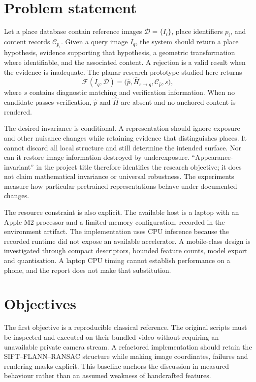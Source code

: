 \section{Problem statement}
Let a place database contain reference images $\mathcal{D}=\{I_i\}$, place identifiers $p_i$, and content records $\mathcal{C}_{p_i}$. Given a query image $I_q$, the system should return a place hypothesis, evidence supporting that hypothesis, a geometric transformation where identifiable, and the associated content. A rejection is a valid result when the evidence is inadequate. The planar research prototype studied here returns
\begin{equation}
 \mathcal{F}(I_q,\mathcal D)=\bigl(\widehat p,\widehat H_{r\rightarrow q},\mathcal C_{\widehat p},s\bigr),
\end{equation}
where $s$ contains diagnostic matching and verification information. When no candidate passes verification, $\widehat p$ and $\widehat H$ are absent and no anchored content is rendered.

The desired invariance is conditional. A representation should ignore exposure and other nuisance changes while retaining evidence that distinguishes places. It cannot discard all local structure and still determine the intended surface. Nor can it restore image information destroyed by underexposure. ``Appearance-invariant'' in the project title therefore identifies the research objective; it does not claim mathematical invariance or universal robustness. The experiments measure how particular pretrained representations behave under documented changes.

The resource constraint is also explicit. The available host is a laptop with an Apple M2 processor and a limited-memory configuration, recorded in the environment artifact. The implementation uses CPU inference because the recorded runtime did not expose an available accelerator. A mobile-class design is investigated through compact descriptors, bounded feature counts, model export and quantisation. A laptop CPU timing cannot establish performance on a phone, and the report does not make that substitution.

\section{Objectives}
The first objective is a reproducible classical reference. The original scripts must be inspected and executed on their bundled video without requiring an unavailable private camera stream. A refactored implementation should retain the SIFT--FLANN--RANSAC structure while making image coordinates, failures and rendering masks explicit. This baseline anchors the discussion in measured behaviour rather than an assumed weakness of handcrafted features.

